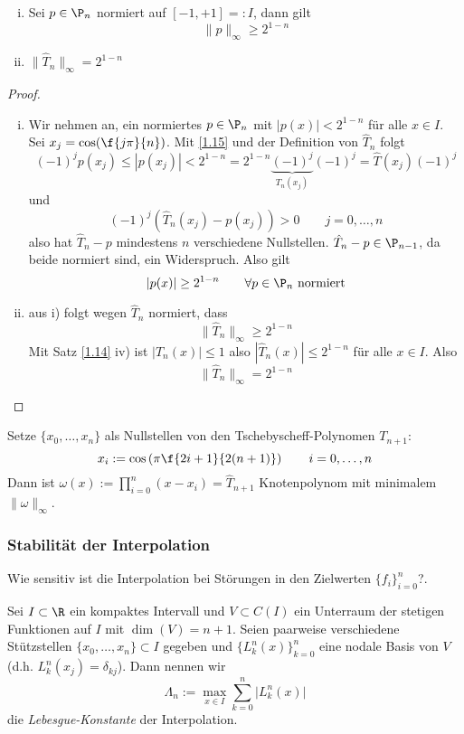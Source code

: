 \documentclass[11pt]{scrartcl}
\begin{document}
\begin{st}[Optimalität]
	\label{1.15}
	\begin{enumerate}[i)]
		\item 
			Sei $p\in \P_n$ normiert auf $[-1,+1] =: I$, dann gilt
			\[
				\|p\|_\infty \ge 2^{1-n}
			\]
		\item
			$\displaystyle \|\hat T_n \|_\infty = 2^{1-n}$
	\end{enumerate}
	\begin{proof}
		\begin{enumerate}[i)]
			\item 
				Wir nehmen an, ein normiertes $p\in \P_n$ mit $|p(x)|<2^{1-n}$ für alle $x\in I$.
				Sei $x_j= \cos(\f {j\pi}{n})$.
				Mit \ref{1.15} und der Definition von $\hat T_n$ folgt
				\[
					(-1)^j p(x_j) \le |p(x_j)| < 2^{1-n} = 2^{1-n}\underbrace{(-1)^j}_{T_n(x_j)}(-1)^j = \hat T(x_j)(-1)^j
				\]
				und
				\[
					(-1)^j(\hat T_n(x_j)-p(x_j)) > 0 \qquad j=0,\dotsc,n
				\]
				also hat $\hat T_n -p$ mindestens $n$ verschiedene Nullstellen. $\hat T_n-p\in \P_{n-1}$, da beide normiert sind, ein Widerspruch.
				Also gilt
				\[
					|p(x)| \ge 2^{1-n} \qquad \forall p\in \P_n \text{ normiert}
				\]
			\item
				aus i) folgt wegen $\hat T_n$ normiert, dass
				\[
					\|\hat T_n\|_\infty \ge 2^{1-n}
				\]
				Mit Satz \ref{1.14} iv) ist $|T_n(x)| \le 1$ also $|\hat T_n(x)| \le 2^{1-n}$ für alle $x\in I$.
				Also 
				\[
					\|\hat T_n\|_\infty = 2^{1-n}
				\]
		\end{enumerate}
	\end{proof}
\end{st}

\begin{kor}
	\label{1.16}
	Setze $\{x_0,\dotsc,x_n\}$ als Nullstellen von den Tschebyscheff-Polynomen $T_{n+1}$:
	\[
		x_i := \cos\left(\pi\f{2i+1}{2(n+1)}\right) \qquad i=0,\dotsc,n
	\]
	Dann ist $\omega(x) := \prod_{i=0}^n (x-x_i) = \hat T_{n+1}$ Knotenpolynom mit minimalem $\|\omega\|_\infty$.
\end{kor}


\subsubsection{Stabilität der Interpolation}


Wie sensitiv ist die Interpolation bei Störungen in den Zielwerten $\{f_i\}_{i=0}^n$?.

\begin{df} \label{1.17}
	Sei $I\subset \R$ ein kompaktes Intervall und $V\subset C(I)$ ein Unterraum der stetigen Funktionen auf $I$ mit $\dim(V)=n+1$.
	Seien paarweise verschiedene Stützstellen $\{x_0,\dotsc, x_n\}\subset I$ gegeben und $\{L_k^n(x)\}_{k=0}^n$ eine nodale Basis von $V$ (d.h. $L_k^n(x_j) = \delta_{kj}$).
	Dann nennen wir
	\[
		\Lambda_n := \max_{x\in I}\sum_{k=0}^n \big|L_k^n(x)\big|
	\]
	die \emph{Lebesgue-Konstante} der Interpolation.
\end{df}
\end{document}
